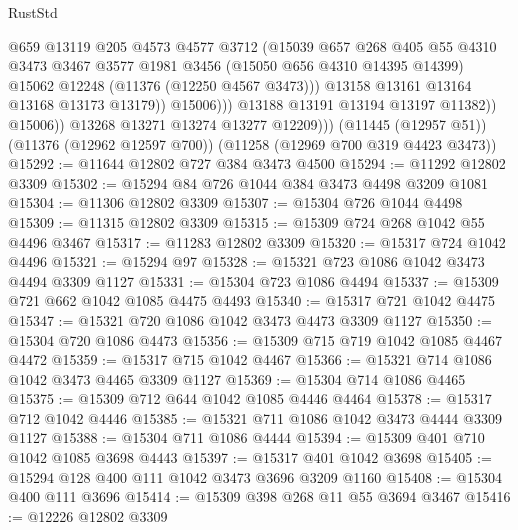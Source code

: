 \begin{lexlean}{RustStd}
\begin{coremodule}
{{{{{{{{{{{{{{{{{{{                            @659
                            @13119
                            @205
                            @4573
                            @4577
                            @3712
                            (@15039
                              @657
                              @268
                              @405
                              @55
                              @4310
                              @3473
                              @3467
                              @3577
                              @1981
                              @3456
                              (@15050 @656 @4310 @14395 @14399)
                              @15062
                              @12248
                              (@11376 (@12250 @4567 @3473)))
                            @13158
                            @13161
                            @13164
                            @13168
                            @13173
                            @13179))
                        @15006)))
                  @13188
                  @13191
                  @13194
                  @13197
                  @11382))
              @15006))
          @13268
          @13271
          @13274
          @13277
          @12209)))
    (@11445 (@12957 @51))
    (@11376 (@12962 @12597 @700))
    (@11258 (@12969 @700 @319 @4423 @3473))
@15292 := @11644 @12802 @727 @384 @3473 @4500
@15294 := @11292 @12802 @3309
@15302 := @15294 @84 @726 @1044 @384 @3473 @4498 @3209 @1081
@15304 := @11306 @12802 @3309
@15307 := @15304 @726 @1044 @4498
@15309 := @11315 @12802 @3309
@15315 := @15309 @724 @268 @1042 @55 @4496 @3467
@15317 := @11283 @12802 @3309
@15320 := @15317 @724 @1042 @4496
@15321 := @15294 @97
@15328 := @15321 @723 @1086 @1042 @3473 @4494 @3309 @1127
@15331 := @15304 @723 @1086 @4494
@15337 := @15309 @721 @662 @1042 @1085 @4475 @4493
@15340 := @15317 @721 @1042 @4475
@15347 := @15321 @720 @1086 @1042 @3473 @4473 @3309 @1127
@15350 := @15304 @720 @1086 @4473
@15356 := @15309 @715 @719 @1042 @1085 @4467 @4472
@15359 := @15317 @715 @1042 @4467
@15366 := @15321 @714 @1086 @1042 @3473 @4465 @3309 @1127
@15369 := @15304 @714 @1086 @4465
@15375 := @15309 @712 @644 @1042 @1085 @4446 @4464
@15378 := @15317 @712 @1042 @4446
@15385 := @15321 @711 @1086 @1042 @3473 @4444 @3309 @1127
@15388 := @15304 @711 @1086 @4444
@15394 := @15309 @401 @710 @1042 @1085 @3698 @4443
@15397 := @15317 @401 @1042 @3698
@15405 := @15294 @128 @400 @111 @1042 @3473 @3696 @3209 @1160
@15408 := @15304 @400 @111 @3696
@15414 := @15309 @398 @268 @11 @55 @3694 @3467
@15416 := @12226 @12802 @3309
}}}}}}}}}}}}}}}}}}}
\end{coremodule}
\end{lexlean}
